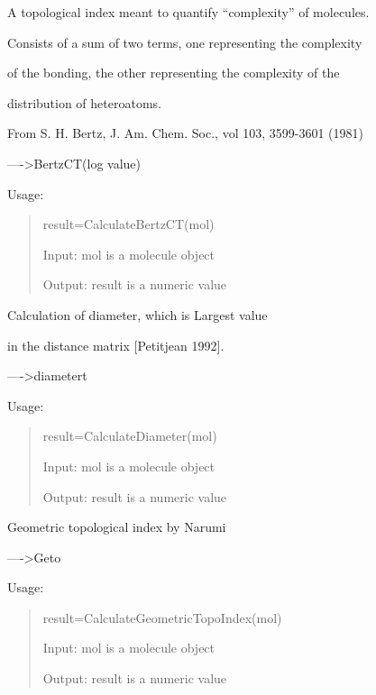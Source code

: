 \documentclass[letterpaper,10pt,english]{sphinxmanual}
\begin{document}

\begin{fulllineitems}
\label{reference/topology:topology.CalculateBertzCT}
A topological index meant to quantify ``complexity'' of molecules.

Consists of a sum of two terms, one representing the complexity

of the bonding, the other representing the complexity of the

distribution of heteroatoms.

From S. H. Bertz, J. Am. Chem. Soc., vol 103, 3599-3601 (1981)

----\textgreater{}BertzCT(log value)

Usage:
\begin{quote}

result=CalculateBertzCT(mol)

Input: mol is a molecule object

Output: result is a numeric value
\end{quote}

\end{fulllineitems}


\begin{fulllineitems}
\label{reference/topology:topology.CalculateDiameter}
Calculation of diameter, which is   Largest value

in the distance matrix {[}Petitjean 1992{]}.

----\textgreater{}diametert

Usage:
\begin{quote}

result=CalculateDiameter(mol)

Input: mol is a molecule object

Output: result is a numeric value
\end{quote}

\end{fulllineitems}


\begin{fulllineitems}
\label{reference/topology:topology.CalculateGeometricTopoIndex}
Geometric topological index by Narumi

----\textgreater{}Geto

Usage:
\begin{quote}

result=CalculateGeometricTopoIndex(mol)

Input: mol is a molecule object

Output: result is a numeric value
\end{quote}

\end{fulllineitems}
\end{document}

